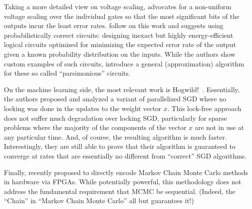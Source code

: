 \documentclass[12pt,leqno,twoside]{article}
\begin{document}
Taking a more detailed view on voltage scaling, \citep{Charkrapani2008}
advocates for a non-uniform voltage scaling over the individual
gates so that the most significant bits of the outputs incur the
least error rates. \citep{palem2009} follow on this work and suggests
using probabilistically correct circuits: designing inexact but
highly energy-efficient logical circuits optimized for minimizing
the expected error rate of the output given a known probability
distribution on the inputs. While the authors show custom examples
of such circuits, \citet{Lingamneni2011} introduce a general
(approximation) algorithm for these so called ``parsimonious''
circuits.

On the machine learning side, the most relevant work is
Hogwild!~\citep{niu11hogwild}. Essentially, the authors proposed
and analyzed a variant of parallelized SGD where no locking was
done in the updates to the weight vector $x$. This lock-free approach
does not suffer much degradation over locking SGD,  particularly
for sparse problems where the majority of the components of the
vector $x$ are not in use at any particular time. And, of course,
the resulting algorithm is much faster.  Interestingly, they are
still able to prove that their algorithm is guaranteed to converge
at rates that are essentially no different from ``correct'' SGD
algorithms.

Finally, \citet{vkm} recently proposed to directly encode Markov Chain
Monte Carlo methods in hardware via FPGAs. While potentially powerful,
this methodology does not address the fundamental requirement that
MCMC be sequential. (Indeed, the ``Chain'' in ``Markov Chain Monte
Carlo'' all but guarantees it!)


 
\end{document}
